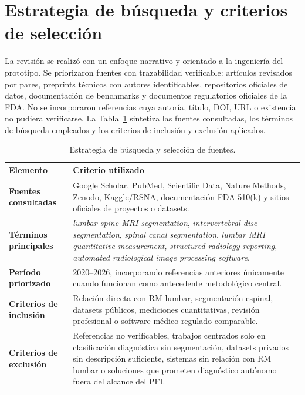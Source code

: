 \section{Estrategia de búsqueda y criterios de selección}

La revisión se realizó con un enfoque narrativo y orientado a la ingeniería del prototipo. Se priorizaron fuentes con trazabilidad verificable: artículos revisados por pares, preprints técnicos con autores identificables, repositorios oficiales de datos, documentación de benchmarks y documentos regulatorios oficiales de la FDA. No se incorporaron referencias cuya autoría, título, DOI, URL o existencia no pudiera verificarse. La Tabla~\ref{tab:estrategia_busqueda_fuentes} sintetiza las fuentes consultadas, los términos de búsqueda empleados y los criterios de inclusión y exclusión aplicados.

\begin{table}[htbp]
\centering
\caption{Estrategia de búsqueda y selección de fuentes.}
\label{tab:estrategia_busqueda_fuentes}
\small
\begin{tabularx}{\textwidth}{p{} X}
\hline
\textbf{Elemento} & \textbf{Criterio utilizado} \\
\hline
\textbf{Fuentes consultadas} & Google Scholar, PubMed, Scientific Data, Nature Methods, Zenodo, Kaggle/RSNA, documentación FDA 510(k) y sitios oficiales de proyectos o datasets.\footnotemark \\
\textbf{Términos principales} & \textit{lumbar spine MRI segmentation}, \textit{intervertebral disc segmentation}, \textit{spinal canal segmentation}, \textit{lumbar MRI quantitative measurement}, \textit{structured radiology reporting}, \textit{automated radiological image processing software}. \\
\textbf{Período priorizado} & 2020--2026, incorporando referencias anteriores únicamente cuando funcionan como antecedente metodológico central. \\
\textbf{Criterios de inclusión} & Relación directa con RM lumbar, segmentación espinal, datasets públicos, mediciones cuantitativas, revisión profesional o software médico regulado comparable. \\
\textbf{Criterios de exclusión} & Referencias no verificables, trabajos centrados solo en clasificación diagnóstica sin segmentación, datasets privados sin descripción suficiente, sistemas sin relación con RM lumbar o soluciones que prometen diagnóstico autónomo fuera del alcance del PFI. \\
\hline
\end{tabularx}
\end{table}

